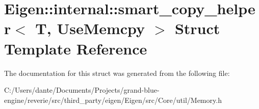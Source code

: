 \hypertarget{struct_eigen_1_1internal_1_1smart__copy__helper}{}\section{Eigen\+::internal\+::smart\+\_\+copy\+\_\+helper$<$ T, Use\+Memcpy $>$ Struct Template Reference}
\label{struct_eigen_1_1internal_1_1smart__copy__helper}


The documentation for this struct was generated from the following file\+:\begin{DoxyCompactItemize}
\item 
C\+:/\+Users/dante/\+Documents/\+Projects/grand-\/blue-\/engine/reverie/src/third\+\_\+party/eigen/\+Eigen/src/\+Core/util/Memory.\+h\end{DoxyCompactItemize}
